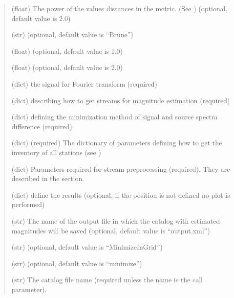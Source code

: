 \documentclass[letterpaper,10pt,english]{sphinxmanual}
\begin{document}
\begin{quote}
\begin{description}
\sphinxAtStartPar
(float) The power of the values distances in the metric. (See {\hyperref[\detokenize{description:inversion-method}]{}})
(optional, default value is 2.0)

\sphinxAtStartPar
(str) (optional, default value is “Brune”)

\sphinxAtStartPar
(float) (optional, default value is 1.0)

\sphinxAtStartPar
(float) (optional, default value is 2.0)

\sphinxAtStartPar
(dict) the signal {\hyperref[\detokenize{configuration:taper-parameters}]{}} for Fourier transform (required)

\sphinxAtStartPar
(dict) {\hyperref[\detokenize{configuration:stream-parameters}]{}} describing how to get streams for magnitude estimation (required)

\sphinxAtStartPar
(dict) {\hyperref[\detokenize{configuration:optimization-parameters}]{}} defining the minimization method of signal and source spectra
difference (required)

\sphinxAtStartPar
(dict) (required) The dictionary of parameters defining how to get the inventory of all stations
(see {\hyperref[\detokenize{configuration:inventory-parameters}]{}})

\sphinxAtStartPar
(dict) Parameters required for stream preprocessing (required).
They are described in the {\hyperref[\detokenize{configuration:remove-response-parameters}]{}} section.

\sphinxAtStartPar
(dict) define the results {\hyperref[\detokenize{configuration:plot-parameters}]{}}
(optional, if the position is not defined no plot is performed)

\sphinxAtStartPar
(str) The name of the output file in which the catalog with estimated magnitudes will be saved
(optional, default value is “output.xml”)

\sphinxAtStartPar
(str) (optional, default value is “MinimizeInGrid”)

\sphinxAtStartPar
(str) (optional, default value is “minimize”)

\sphinxAtStartPar
(str) The catalog file name (required unless the name is the call parameter).

\end{description}\end{quote}
\end{document}
